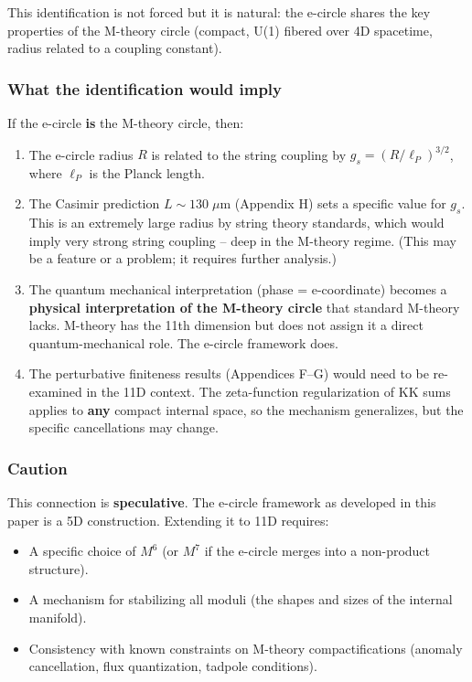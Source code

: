\documentclass[aps,prd,preprint,superscriptaddress,longbibliography,floatfix]{revtex4-2}
\theoremstyle{remark}
\begin{document}
This identification is not forced but it is natural: the e-circle shares the key properties of the M-theory circle (compact, U(1) fibered over 4D spacetime, radius related to a coupling constant).


\subsubsection{What the identification would imply}

If the e-circle \textbf{is} the M-theory circle, then:


\begin{enumerate}
  \item The e-circle radius $R$ is related to the string coupling by $g_s = (R / \ell_P)^{3/2}$, where $\ell_P$ is the Planck length.
  \item The Casimir prediction $L \sim 130\;\mu\text{m}$ (Appendix H) sets a specific value for $g_s$. This is an extremely large radius by string theory standards, which would imply very strong string coupling -- deep in the M-theory regime. (This may be a feature or a problem; it requires further analysis.)
  \item The quantum mechanical interpretation (phase = e-coordinate) becomes a \textbf{physical interpretation of the M-theory circle} that standard M-theory lacks. M-theory has the 11th dimension but does not assign it a direct quantum-mechanical role. The e-circle framework does.
  \item The perturbative finiteness results (Appendices F--G) would need to be re-examined in the 11D context. The zeta-function regularization of KK sums applies to \textbf{any} compact internal space, so the mechanism generalizes, but the specific cancellations may change.
\end{enumerate}


\subsubsection{Caution}

This connection is \textbf{speculative}. The e-circle framework as developed in this paper is a 5D construction. Extending it to 11D requires:


\begin{itemize}
  \item A specific choice of $M^6$ (or $M^7$ if the e-circle merges into a non-product structure).
  \item A mechanism for stabilizing all moduli (the shapes and sizes of the internal manifold).
  \item Consistency with known constraints on M-theory compactifications (anomaly cancellation, flux quantization, tadpole conditions).
\end{itemize}
\end{document}
